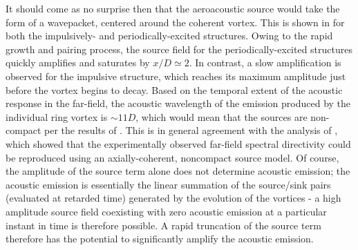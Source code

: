 It should come as no surprise then that the aeroacoustic source would take the form of a wavepacket, centered around the coherent vortex.
This is shown in  for both the impulsively- and periodically-excited structures.
Owing to the rapid growth and pairing process, the source field for the periodically-excited structures quickly amplifies and saturates by $x/D \simeq 2$.
In contrast, a slow amplification is observed for the impulsive structure, which reaches its maximum amplitude just before the vortex begins to decay. 
Based on the temporal extent of the acoustic response in the far-field, the acoustic wavelength of the emission produced by the individual ring vortex is $\sim 11D$, which would mean that the sources are non-compact per the results of .
This is in general agreement with the analysis of \citet{Michalke1972}, which showed that the experimentally observed far-field spectral directivity could be reproduced using an axially-coherent, noncompact source model.
Of course, the amplitude of the source term alone does not determine acoustic emission; the acoustic emission is essentially the linear summation of the source/sink pairs (evaluated at retarded time) generated by the evolution of the vortices - a high amplitude source field coexisting with zero acoustic emission at a particular instant in time is therefore possible.
A rapid truncation of the source term therefore has the potential to significantly amplify the acoustic emission.
